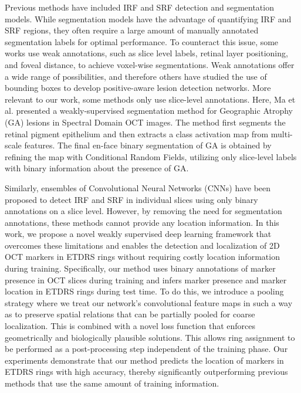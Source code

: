 Previous methods have included IRF and SRF detection and segmentation models. While segmentation models have the advantage of quantifying IRF and SRF regions, they often require a large amount of manually annotated segmentation labels for optimal performance. To counteract this issue, some works use weak annotations, such as slice level labels, retinal layer positioning, and foveal distance, to achieve voxel-wise segmentations. Weak annotations offer a wide range of possibilities, and therefore others have studied the use of bounding boxes to develop positive-aware lesion detection networks. More relevant to our work, some methods only use slice-level annotations. Here, Ma et al. presented a weakly-supervised segmentation method for Geographic Atrophy (GA) lesions in Spectral Domain OCT images.  The method first segments the retinal pigment epithelium and then extracts a class activation map from multi-scale features. The final en-face binary segmentation of GA is obtained by refining the map with Conditional Random Fields, utilizing only slice-level labels with binary information about the presence of GA.


Similarly, ensembles of Convolutional Neural Networks (CNNs) have been proposed to detect IRF and SRF in individual slices using only binary annotations on a slice level. However, by removing the need for segmentation annotations, these methods cannot provide any location information.  In this work, we propose a novel weakly supervised deep learning framework that overcomes these limitations and enables the detection and localization of 2D OCT markers in ETDRS rings without requiring costly location information during training. Specifically, our method uses binary annotations of marker presence in OCT slices during training and infers marker presence and marker location in ETDRS rings during test time. To do this, we introduce a pooling strategy where we treat our network's convolutional feature maps in such a way as to preserve spatial relations that can be partially pooled for coarse localization. This is combined with a novel loss function that enforces geometrically and biologically plausible solutions. This allows ring assignment to be performed as a post-processing step independent of the training phase. Our experiments demonstrate that our method predicts the location of markers in ETDRS rings with high accuracy, thereby significantly outperforming previous methods that use the same amount of training information. 